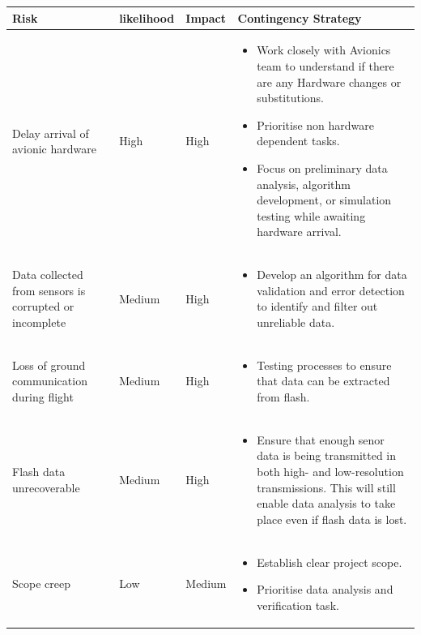 \begin{table}[]
\centering
\begin{tabular}{>{\raggedright}p{4cm}p{1.5cm}p{1.5cm}p{7cm}}
\toprule
\textbf{Risk} & \textbf{likelihood} & \textbf{Impact} & \textbf{Contingency Strategy} \\ \midrule
Delay arrival of avionic hardware & High & High & \vspace{-1.5em}
\begin{itemize}[leftmargin=*]
  \item Work closely with Avionics team to understand if there are any Hardware changes or substitutions.
  \item Prioritise non hardware dependent tasks.
  \item Focus on preliminary data analysis, algorithm development, or simulation testing while awaiting hardware arrival.
\end{itemize}\\\midrule
Data collected from sensors is corrupted or incomplete & Medium & High & \vspace{-1.5em}
\begin{itemize}[leftmargin=*]
  \item Develop an algorithm for data validation and error detection to identify and filter out unreliable data.
\end{itemize}\\\midrule
Loss of ground communication during flight & Medium & High & \vspace{-1.5em}
\begin{itemize}[leftmargin=*]
  \item Testing processes to ensure that data can be extracted from flash.
\end{itemize}\\\midrule
Flash data unrecoverable & Medium & High & \vspace{-1.5em}
\begin{itemize}[leftmargin=*]
  \item Ensure that enough senor data is being transmitted in both high- and low-resolution transmissions. This will still enable data analysis to take place even if flash data is lost.
\end{itemize}\\\midrule
Scope creep & Low & Medium & \vspace{-1.5em}
\begin{itemize}[leftmargin=*]
  \item Establish clear project scope.  
  \item Prioritise data analysis and verification task.  

\end{itemize}
\end{tabular}
\end{table}
